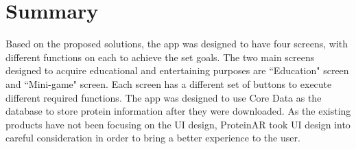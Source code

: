 \section{Summary}
Based on the proposed solutions, the app was designed to have four screens, with different functions on each to achieve the set goals. The two main screens designed to acquire educational and entertaining purposes are ``Education" screen and ``Mini-game" screen. Each screen has a different set of buttons to execute different required functions. The app was designed to use Core Data as the database to store protein information after they were downloaded. As the existing products have not been focusing on the UI design, ProteinAR took UI design into careful consideration in order to bring a better experience to the user. 



